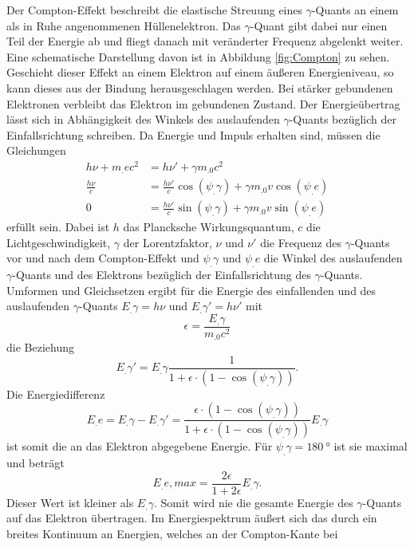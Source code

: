 Der Compton-Effekt beschreibt die elastische Streuung eines $\gamma$-Quants an einem als in Ruhe angenommenen Hüllenelektron. Das $\gamma$-Quant gibt dabei nur einen Teil der Energie ab und fliegt danach mit veränderter Frequenz abgelenkt weiter. Eine schematische Darstellung davon ist in Abbildung \ref{fig:Compton} zu sehen.
Geschieht dieser Effekt an einem Elektron auf einem äußeren Energieniveau, so kann dieses aus der Bindung herausgeschlagen werden. Bei stärker gebundenen Elektronen verbleibt das Elektron im gebundenen Zustand.
Der Energieübertrag lässt sich in Abhängigkeit des Winkels des auslaufenden $\gamma$-Quants bezüglich der Einfallsrichtung schreiben.
Da Energie und Impuls erhalten sind, müssen die Gleichungen
\begin{align*}
h \nu + m_.e c^2 &= h \nu '+ \gamma m_.0 c^2\\
\frac{h \nu}{c}&= \frac{h \nu '}{c}\cos(\psi_.{\gamma})+\gamma m_.0 v\cos(\psi_.e)\\
0&= \frac{h\nu '}{c}\sin(\psi_.{\gamma})+\gamma m_.0 v\sin(\psi_.e)
\end{align*}
erfüllt sein. Dabei ist $h$ das Plancksche Wirkungsquantum, $c$ die Lichtgeschwindigkeit, $\gamma$ der Lorentzfaktor, $\nu$ und $\nu '$ die Frequenz des $\gamma$-Quants vor und nach dem Compton-Effekt und $\psi_.{\gamma}$ und $\psi_.e$ die Winkel des auslaufenden $\gamma$-Quants und des Elektrons bezüglich der Einfallsrichtung des $\gamma$-Quants.
Umformen und Gleichsetzen ergibt für die Energie des einfallenden und des auslaufenden $\gamma$-Quants $E_.{\gamma}=h\nu$ und $E_.{\gamma}'=h\nu '$ mit \[\epsilon=\frac{E_.{\gamma}}{m_.0c^2}\] die Beziehung
\begin{equation}
E_.{\gamma}'= E_.{\gamma}\frac{1}{1+\epsilon\cdot\left(1-\cos(\psi_.{\gamma})\right)}\text{.}
\end{equation}
Die Energiedifferenz
\begin{equation}
E_.e=E_.{\gamma}-E_.{\gamma}' =\frac{\epsilon\cdot\left(1-\cos(\psi_.{\gamma})\right)}{1+\epsilon\cdot\left(1-\cos(\psi_.{\gamma})\right)}E_.{\gamma}
\end{equation}
ist somit die an das Elektron abgegebene Energie.
Für $\psi_.{\gamma}=\SI{180}{\degree}$ ist sie maximal und beträgt
\begin{equation}
E_.{e,max}=\frac{2\epsilon}{1+2\epsilon}E_.{\gamma}\text{.}\label{eq:Emax}
\end{equation}
Dieser Wert ist kleiner als $E_.{\gamma}$. Somit wird nie die gesamte Energie des $\gamma$-Quants auf das Elektron übertragen. Im Energiespektrum äußert sich das durch ein breites Kontinuum an Energien, welches an der Compton-Kante bei

